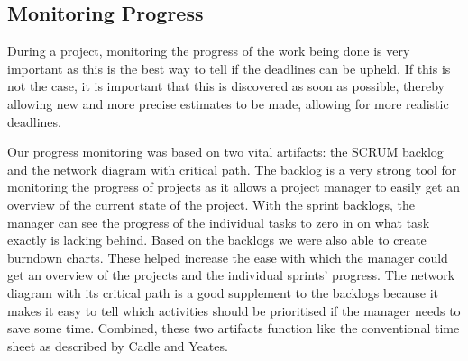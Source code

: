 \subsection{Monitoring Progress}
\label{sec:EmpiriProgress}
During a project, monitoring the progress of the work being done is very important as this is the best way to tell if the deadlines can be upheld. If this is not the case, it is important that this is discovered as soon as possible, thereby allowing new and more precise estimates to be made, allowing for more realistic deadlines.

Our progress monitoring was based on two vital artifacts: the SCRUM backlog and the network diagram with critical path. The backlog is a very strong tool for monitoring the progress of projects as it allows a project manager to easily get an overview of the current state of the project. With the sprint backlogs, the manager can see the progress of the individual tasks to zero in on what task exactly is lacking behind. Based on the backlogs we were also able to create burndown charts. These helped increase the ease with which the manager could get an overview of the projects and the individual sprints' progress. The network diagram with its critical path is a good supplement to the backlogs because it makes it easy to tell which activities should be prioritised if the manager needs to save some time. Combined, these two artifacts function like the conventional time sheet as described by Cadle and Yeates.
